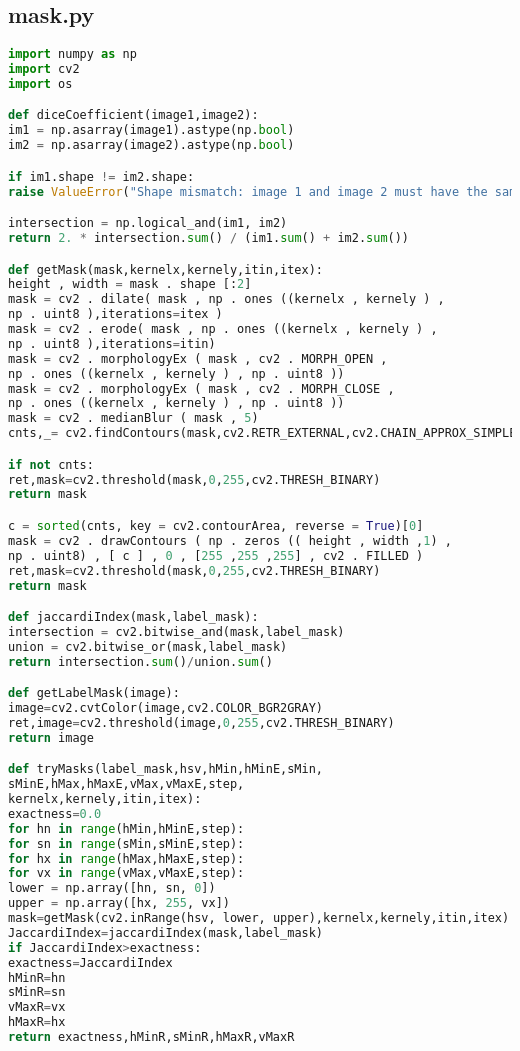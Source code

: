 \documentclass[12pt]{article}
\begin{document}
\subsection{mask.py}
\begin{lstlisting}[language=Python]
import numpy as np
import cv2
import os

def diceCoefficient(image1,image2):
im1 = np.asarray(image1).astype(np.bool)
im2 = np.asarray(image2).astype(np.bool)

if im1.shape != im2.shape:
raise ValueError("Shape mismatch: image 1 and image 2 must have the same shape.")

intersection = np.logical_and(im1, im2)
return 2. * intersection.sum() / (im1.sum() + im2.sum())

def getMask(mask,kernelx,kernely,itin,itex):
height , width = mask . shape [:2]
mask = cv2 . dilate( mask , np . ones ((kernelx , kernely ) ,
np . uint8 ),iterations=itex )
mask = cv2 . erode( mask , np . ones ((kernelx , kernely ) ,
np . uint8 ),iterations=itin)           
mask = cv2 . morphologyEx ( mask , cv2 . MORPH_OPEN ,
np . ones ((kernelx , kernely ) , np . uint8 ))
mask = cv2 . morphologyEx ( mask , cv2 . MORPH_CLOSE ,
np . ones ((kernelx , kernely ) , np . uint8 ))
mask = cv2 . medianBlur ( mask , 5)
cnts,_= cv2.findContours(mask,cv2.RETR_EXTERNAL,cv2.CHAIN_APPROX_SIMPLE)

if not cnts:
ret,mask=cv2.threshold(mask,0,255,cv2.THRESH_BINARY)
return mask

c = sorted(cnts, key = cv2.contourArea, reverse = True)[0]
mask = cv2 . drawContours ( np . zeros (( height , width ,1) ,
np . uint8) , [ c ] , 0 , [255 ,255 ,255] , cv2 . FILLED )
ret,mask=cv2.threshold(mask,0,255,cv2.THRESH_BINARY)
return mask

def jaccardiIndex(mask,label_mask):
intersection = cv2.bitwise_and(mask,label_mask)
union = cv2.bitwise_or(mask,label_mask)
return intersection.sum()/union.sum()

def getLabelMask(image):
image=cv2.cvtColor(image,cv2.COLOR_BGR2GRAY)
ret,image=cv2.threshold(image,0,255,cv2.THRESH_BINARY)
return image

def tryMasks(label_mask,hsv,hMin,hMinE,sMin,
sMinE,hMax,hMaxE,vMax,vMaxE,step,
kernelx,kernely,itin,itex):
exactness=0.0
for hn in range(hMin,hMinE,step):
for sn in range(sMin,sMinE,step):
for hx in range(hMax,hMaxE,step):
for vx in range(vMax,vMaxE,step):
lower = np.array([hn, sn, 0])
upper = np.array([hx, 255, vx])
mask=getMask(cv2.inRange(hsv, lower, upper),kernelx,kernely,itin,itex)
JaccardiIndex=jaccardiIndex(mask,label_mask)
if JaccardiIndex>exactness:
exactness=JaccardiIndex
hMinR=hn
sMinR=sn
vMaxR=vx
hMaxR=hx
return exactness,hMinR,sMinR,hMaxR,vMaxR




\end{lstlisting}
\end{document}
